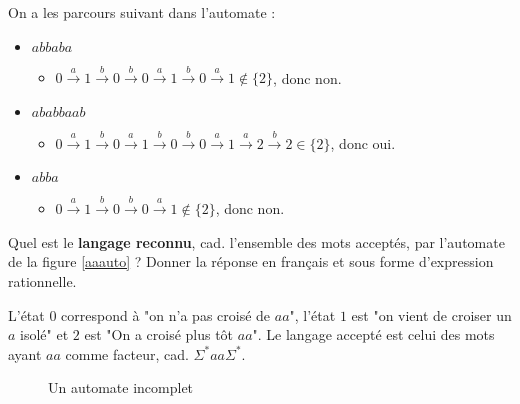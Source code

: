 \begin{correction*}
On a les parcours suivant dans l'automate :
\begin{itemize}

\item $abbaba$
\begin{itemize}
\item[] $0 \xrightarrow{a} 1 \xrightarrow{b} 0 \xrightarrow{b} 0 \xrightarrow{a} 1 \xrightarrow{b} 0 \xrightarrow{a} 1 \notin \{2\}$, donc non.
\end{itemize}

\item $ababbaab$
\begin{itemize}
\item[] $0 \xrightarrow{a} 1 \xrightarrow{b} 0 \xrightarrow{a} 1 \xrightarrow{b} 0 \xrightarrow{b} 0 \xrightarrow{a} 1 \xrightarrow{a} 2 \xrightarrow{b} 2 \in \{2\}$, donc oui.
\end{itemize}

\item $abba$
\begin{itemize}
\item[] $0 \xrightarrow{a} 1 \xrightarrow{b} 0 \xrightarrow{b} 0 \xrightarrow{a} 1 \notin \{2\}$, donc non.
\end{itemize}

\end{itemize}
\end{correction*}

\begin{exercice}
Quel est le \textbf{langage reconnu}, cad. l'ensemble des mots acceptés, par l'automate de la figure \ref{aaauto} ? Donner la réponse en français et sous forme d'expression rationnelle.
\end{exercice}

\begin{correction*}
L'état $0$ correspond à "on n'a pas croisé de $aa$", l'état $1$ est "on vient de croiser un $a$ isolé" et $2$ est "On a croisé plus tôt $aa$". Le langage accepté est celui des mots ayant $aa$ comme facteur, cad. $\Sigma^*aa\Sigma^*$.
\end{correction*}


\begin{figure}[!h]
\centering
{}
\caption{Un automate incomplet}
\label{incompauto}
\end{figure}



